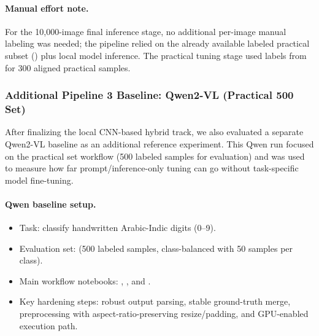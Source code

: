 \paragraph{Manual effort note.}
For the 10,000-image final inference stage, no additional per-image manual labeling was needed; the pipeline relied on the already available labeled practical subset () plus local model inference.
The practical tuning stage used labels from  for 300 aligned practical samples.

\subsubsection{Additional Pipeline 3 Baseline: Qwen2-VL (Practical 500 Set)}

After finalizing the local CNN-based hybrid track, we also evaluated a separate Qwen2-VL baseline as an additional reference experiment. This Qwen run focused on the practical set workflow (500 labeled samples for evaluation) and was used to measure how far prompt/inference-only tuning can go without task-specific model fine-tuning.

\paragraph{Qwen baseline setup.}
\begin{itemize}
    \item Task: classify handwritten Arabic-Indic digits (0--9).
    \item Evaluation set:  (500 labeled samples, class-balanced with 50 samples per class).
    \item Main workflow notebooks: , , and .
    \item Key hardening steps: robust output parsing, stable ground-truth merge, preprocessing with aspect-ratio-preserving resize/padding, and GPU-enabled execution path.
\end{itemize}

